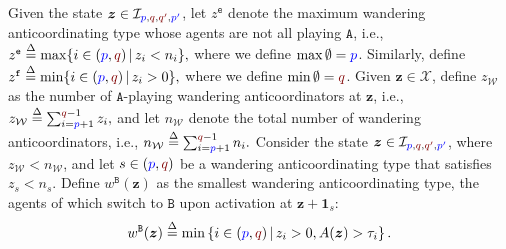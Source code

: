 \documentclass[10 pt,twocolumn,journal]{IEEEtran}
\theoremstyle{plain}
\newtheorem{lemma}{Lemma}
\newcommand{\db}{\overset{\Delta}{=}}
\newcommand{\A}{\mathcal{A}}
\newcommand{\I}{\mathcal{I}}
\newcommand{\X}{\mathcal{X}}
\newcommand{\W}{\mathcal{W}}
\newcommand{\R}{\mathcal{R}}
\newcommand{\x}{\bm{x}}
\newcommand{\z}{\bm{z}}
\newcommand{\p}{\tb{p}}
\newcommand{\pp}{\tb{p'}}
\newcommand{\q}{\tr{q}}
\newcommand{\qq}{\tr{q'}}
\newcommand{\e}{\mathtt{e}}
\newcommand{\f}{\mathtt{f}}
\renewcommand{\A}{\mathtt{A}}
\newcommand{\B}{\mathtt{B}}
\newcommand{\tb}{\textcolor{blue}}
\newcommand{\tr}{\textcolor{Myred}}
\theoremstyle{definition}
\begin{document}
Given the state $\z\in\I_{\p,\q,\qq,\pp}$, let $z^{\e}$ denote the maximum wandering anticoordinating type whose agents are not all playing $\A$, i.e., 
$
    z^{\e} \db \max\{i\in(\p,\q)\,|\, z_i<n_i\},
$
where we define $\max\emptyset = \p$.
Similarly, define
$
    z^{\f} \db \min\{i\in(\p,\q)\,|\, z_i>0\},
$
where we define $\min\emptyset = \q$.
Given $\z\in\X$, define $z_\W$ as the number of $\A$-playing wandering anticoordinators at $\z$, i.e., 
$
    z_\W \db \sum_{i=\p+1}^{\q-1}z_i,
$
and let $n_\W$ denote the total number of wandering anticoordinators, i.e., 
$
    n_\W \db \sum_{i=\p+1}^{\q-1}n_i.
$
Consider the state $\z\in\I_{\p,\q,\qq,\pp}$, where $z_\W<n_\W$, and let $s\in(\p,\q)$ be a wandering anticoordinating type that satisfies $z_s<n_s$.
Define $w^{\B}(\z)$ as the smallest wandering anticoordinating type, the agents of which switch to $\B$ upon activation at $\z+\bm{1}_s$:
\begin{equation*}
    w^{\B}(\z) \db
    \min\left\{i\in(\p,\q) \,|\, z_i>0,
    A(\z) > {\tau_{i}}
    \right\}.
\end{equation*}
\end{document}
